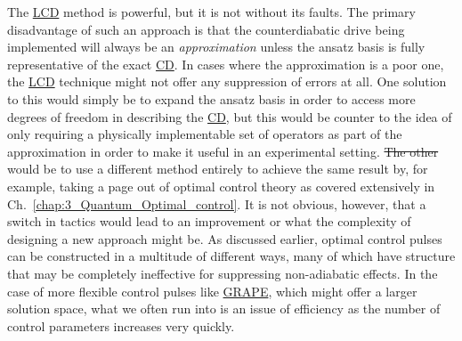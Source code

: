 \documentclass[a4paper,oneside,11pt]{book}
\newcommand{\acrref}[1]{\hyperref[acr:#1]{#1}}
\providecommand{\DIFaddtex}[1]{{\protect\color{blue}\uwave{#1}}} %
\providecommand{\DIFdeltex}[1]{{\protect\color{red}\sout{#1}}}                      %
\providecommand{\DIFaddbegin}{} %
\providecommand{\DIFaddend}{} %
\providecommand{\DIFdelbegin}{} %
\providecommand{\DIFdelend}{} %
\providecommand{\DIFadd}[1]{\texorpdfstring{\DIFaddtex{#1}}{#1}} %
\providecommand{\DIFdel}[1]{\texorpdfstring{\DIFdeltex{#1}}{}} %
\newcommand{\DIFscaledelfig}{0.5}
\newlength{\DIFdelgraphicswidth} %
\newlength{\DIFdelgraphicsheight} %
\newcommand{\DIFaddincludegraphics}[2][]{{\color{blue}\fbox{\DIFOincludegraphics[#1]{#2}}}} %
\newcommand{\DIFdelincludegraphics}[2][]{%
\sbox{\DIFdelgraphicsbox}{\DIFOincludegraphics[#1]{#2}}%
\settoboxwidth{\DIFdelgraphicswidth}{\DIFdelgraphicsbox} %
\settoboxtotalheight{\DIFdelgraphicsheight}{\DIFdelgraphicsbox} %
\scalebox{\DIFscaledelfig}{%
\parbox[b]{\DIFdelgraphicswidth}{\usebox{\DIFdelgraphicsbox}\\[-\baselineskip] \rule{\DIFdelgraphicswidth}{0em}}\llap{\resizebox{\DIFdelgraphicswidth}{\DIFdelgraphicsheight}{%
\setlength{\unitlength}{\DIFdelgraphicswidth}%
\begin{picture}(1,1)%
\thicklines\linethickness{2pt} %
{\color[rgb]{1,0,0}\put(0,0){\framebox(1,1){}}}%
{\color[rgb]{1,0,0}\put(0,0){\line( 1,1){1}}}%
{\color[rgb]{1,0,0}\put(0,1){\line(1,-1){1}}}%
\end{picture}%
}\hspace*{3pt}}} %
} %
\DeclareRobustCommand{\DIFaddbegin}{\DIFOaddbegin \let\includegraphics\DIFaddincludegraphics} %
\DeclareRobustCommand{\DIFaddend}{\DIFOaddend \let\includegraphics\DIFOincludegraphics} %
\DeclareRobustCommand{\DIFdelbegin}{\DIFOdelbegin \let\includegraphics\DIFdelincludegraphics} %
\DeclareRobustCommand{\DIFdelend}{\DIFOaddend \let\includegraphics\DIFOincludegraphics} %
\begin{document}
The \acrref{LCD} method is powerful, but it is not without its faults. The primary disadvantage of such an approach is that the counterdiabatic drive being implemented will always be an \emph{approximation} unless the ansatz basis is fully representative of the exact \acrref{CD}. In cases where the approximation is a poor one, the \acrref{LCD} technique might not offer any suppression of errors at all. One solution to this would simply be to expand the ansatz basis in order to access more degrees of freedom in describing the \acrref{CD}, but this would be counter to the idea of only requiring a physically implementable set of operators as part of the approximation in order to make it useful in an experimental setting. \DIFdelbegin \DIFdel{The other }\DIFdelend \DIFaddbegin \DIFadd{Another solution }\DIFaddend would be to use a different method entirely to achieve the same result by, for example, taking a page out of optimal control theory as covered extensively in Ch.~\ref{chap:3_Quantum_Optimal_control}. It is not obvious, however, that a switch in tactics would lead to an improvement or what the complexity of designing a new approach might be. As discussed earlier, optimal control pulses can be constructed in a multitude of different ways, many of which have structure that may be completely ineffective for suppressing non-adiabatic effects. In the case of more flexible control pulses like \acrref{GRAPE}, which might offer a larger solution space, what we often run into is an issue of efficiency as the number of control parameters increases very quickly. 
\end{document}
